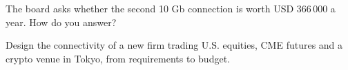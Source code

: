 \begin{interviewq}\label{iq:nw:build-a-connectivity-plan:5}
The board asks whether the second 10 Gb connection is worth USD 366\,000 a year. How do you answer?
\end{interviewq}

\begin{interviewq}\label{iq:nw:build-a-connectivity-plan:6}
Design the connectivity of a new firm trading U.S. equities, CME futures and a crypto venue in Tokyo, from requirements to budget.
\end{interviewq}
